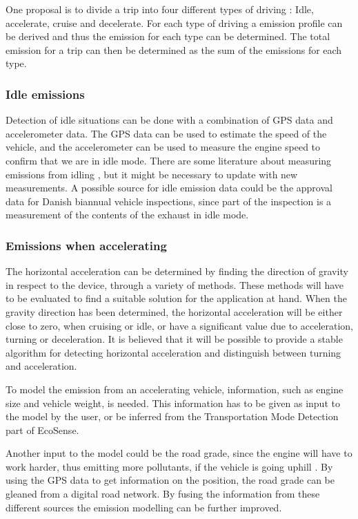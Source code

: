 One proposal is to divide a trip into four different types of driving : Idle, accelerate, cruise and decelerate. For each type of driving a emission profile can be derived and thus the emission for each type can be determined. The total emission for a trip can then be determined as the sum of the emissions for each type.

\subsubsection{Idle emissions}\label{Idle}
Detection of idle situations can be done with a combination of GPS data and accelerometer data. The GPS data can be used to estimate the speed of the vehicle, and the accelerometer can be used to measure the engine speed to confirm that we are in idle mode. There are some literature about measuring emissions from idling \cite{haan2000}\cite{pujadas2004}, but it might be necessary to update with new measurements. A possible source for idle emission data could be the approval data for Danish biannual vehicle inspections, since part of the inspection is a measurement of the contents of the exhaust in idle mode.

\subsubsection{Emissions when accelerating}
The horizontal acceleration can be determined by finding the direction of gravity in respect to the device, through a variety of methods. These methods will have to be evaluated to find a suitable solution for the application at hand.
When the gravity direction has been determined, the horizontal acceleration will be either close to zero, when cruising or idle, or have a significant value due to acceleration, turning or deceleration. It is believed that it will be possible to provide a stable algorithm for detecting horizontal acceleration and distinguish between turning and acceleration.

To model the emission from an accelerating vehicle, information, such as engine size and vehicle weight, is needed. This information has to be given as input to the model by the user, or be inferred from the Transportation Mode Detection part of EcoSense.

Another input to the model could be the road grade, since the engine will have to work harder, thus emitting more pollutants, if the vehicle is going uphill \cite{kaul2013}. By using the GPS data to get information on the position, the road grade can be gleaned from a digital road network. By fusing the information from these different sources the emission modelling  can be further improved.  


